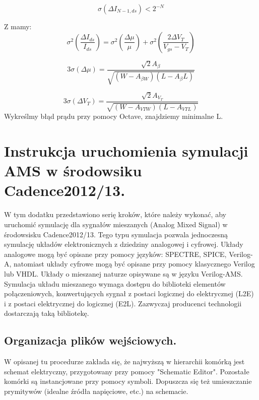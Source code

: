 \documentclass[10pt,a4paper]{report}
\theoremstyle{definition}
\theoremstyle{definition}
\theoremstyle{definition}
\theoremstyle{definition}
\theoremstyle{definition}
\begin{document}
{{		\begin{equation}
		\sigma \left( \Delta I_{N-1,ds} \right) < 2^{-N}
		\end{equation}
		
		Z \cite{ams_match_params} mamy:
		\begin{equation}
		\sigma^2 \left( \frac{\Delta I_{ds}}{I_{ds}}\right) = 	\sigma^2 \left( \frac{\Delta \mu}{\mu}\right) + \sigma^2 \left( \frac{2\Delta V_T}{V_{gs} - V_{T}}\right)
		\end{equation}
		
		\begin{equation}
		3 \sigma \left(\Delta \mu \right) = \frac{ \sqrt{2} A_{\beta}  } { \sqrt{ \left(W-A_{\beta W}\right)\left(L-A_{\beta} L\right)}}
		\end{equation}
		
		\begin{equation}
		3 \sigma \left(\Delta V_T \right) = \frac{ \sqrt{2} A_{V_T}  } { \sqrt{ \left(W-A_{VTW}\right)\left(L-A_{VTL}\right)}}
		\end{equation}
		Wykreślmy błąd prądu przy pomocy Octave, znajdziemy minimalne L.
		
	}
	\chapter{Instrukcja uruchomienia symulacji AMS w środowsiku Cadence2012/13.}
	{	W tym dodatku przedstawiono serię kroków, które należy wykonać, aby uruchomić symulację dla sygnałów mieszanych (Analog Mixed Signal) w środowsisku Cadence2012/13. Tego typu symulacja pozwala jednoczesną symulację układów elektronicznych z dziedziny analogowej i cyfrowej. Układy analogowe mogą być opisane przy pomocy języków: SPECTRE, SPICE, Verilog-A, natomiast układy cyfrowe mogą być opisane przy pomocy klasycznego Verilog lub VHDL. Układy o mieszanej naturze opisywane są w języku Verilog-AMS.}
	{	Symulacja układu mieszanego wymaga dostępu do biblioteki elementów połączeniowych, konwertujących sygnał z postaci logicznej do elektrycznej (L2E) i z postaci elektrycznej do logicznej (E2L). Zazwyczaj producenci technologii dostarczają taką bibliotekę.}
	\section{Organizacja plików wejściowych.}
	{	W opisanej tu procedurze zakłada się, że najwyższą w hierarchii komórką jest schemat elektryczny, przygotowany przy pomocy "Schematic Editor". Pozostałe komórki są instancjowane przy pomocy symboli. Dopuszcza się też umieszczanie prymitywów (idealne źródła napięciowe, etc.) na schemacie.}
}
\end{document}

